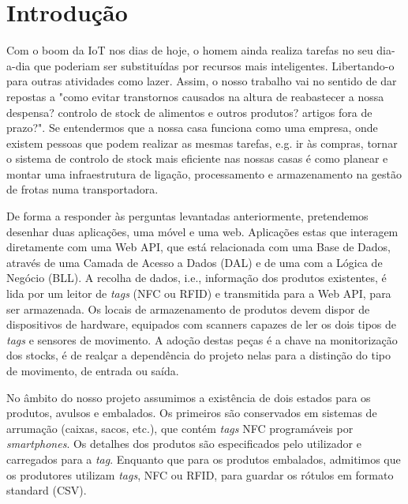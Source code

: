 %
%
\chapter*{Introdução} \label{Intro}

Com o boom da IoT nos dias de hoje, o homem ainda realiza tarefas no seu dia-a-dia que poderiam ser substituídas por recursos mais inteligentes. Libertando-o para outras atividades como lazer. Assim, o nosso trabalho vai no sentido de dar repostas a "como evitar transtornos causados na altura de reabastecer a nossa despensa? controlo de stock de alimentos e outros produtos? artigos fora de prazo?". Se entendermos que a nossa casa funciona como uma empresa, onde existem pessoas que podem realizar as mesmas tarefas, e.g. ir às compras, tornar o sistema de controlo de stock mais eficiente nas nossas casas é como planear e montar uma infraestrutura de ligação, processamento e armazenamento na gestão de frotas numa transportadora.

De forma a responder às perguntas levantadas anteriormente, pretendemos desenhar duas aplicações, uma móvel e uma web. Aplicações estas que interagem diretamente com uma Web API, que está relacionada com uma Base de Dados, através de uma Camada de Acesso a Dados (DAL) e de uma com a Lógica de Negócio (BLL). A recolha de dados, i.e., informação dos produtos existentes, é lida por um leitor de {\itshape tags} (NFC ou RFID) e transmitida para a Web API, para ser armazenada. Os locais de armazenamento de produtos devem dispor de dispositivos de hardware, equipados com scanners capazes de ler os dois tipos de {\itshape tags} e sensores de movimento. A adoção destas peças é a chave na monitorização dos stocks, é de realçar a dependência do projeto nelas para a distinção do tipo de movimento, de entrada ou saída.

No âmbito do nosso projeto assumimos a existência de dois estados para os produtos, avulsos e embalados. Os primeiros são conservados em sistemas de arrumação (caixas, sacos, etc.), que contém {\itshape tags} NFC programáveis por {\itshape smartphones}. Os detalhes dos produtos são especificados pelo utilizador e carregados para a {\itshape tag}. Enquanto que para os produtos embalados, admitimos que os produtores utilizam {\itshape tags}, NFC ou RFID, para guardar os rótulos em formato standard (CSV).
